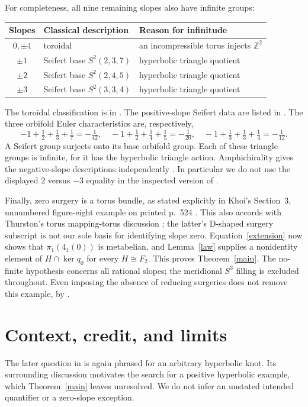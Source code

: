 \documentclass[11pt]{article}
\newcommand{\Z}{\mathbb Z}
\begin{document}
For completeness, all nine remaining slopes also have infinite groups:
\begin{center}
\begin{tabular}{c|l|l}
Slopes & Classical description & Reason for infinitude\\\hline
$0,\pm4$ & toroidal & an incompressible torus injects $\Z^2$\\
$\pm1$ & Seifert base $S^2(2,3,7)$ & hyperbolic triangle quotient\\
$\pm2$ & Seifert base $S^2(2,4,5)$ & hyperbolic triangle quotient\\
$\pm3$ & Seifert base $S^2(3,3,4)$ & hyperbolic triangle quotient
\end{tabular}
\end{center}
The toroidal classification is in \cite{BW}. The positive-slope Seifert
data are listed in \cite[Section~9.4, p.~71]{GM}. The three orbifold Euler
characteristics are, respectively,
\[
 -1+\tfrac12+\tfrac13+\tfrac17=-\tfrac1{42},\quad
 -1+\tfrac12+\tfrac14+\tfrac15=-\tfrac1{20},\quad
 -1+\tfrac13+\tfrac13+\tfrac14=-\tfrac1{12}.
\]
A Seifert group surjects onto its base orbifold group. Each of these
triangle groups is infinite, for it has the hyperbolic triangle action.
Amphichirality gives the negative-slope descriptions independently
\cite[Chapter~4]{Th}. In particular we do not use the displayed
$2$ versus $-3$ equality in the inspected version of \cite[Section~9.4]{GM}.

Finally, zero surgery is a torus bundle, as stated explicitly in Khoi's
Section~3, unnumbered figure-eight example on printed p.~524 \cite{Khoi}.
This also accords with Thurston's torus mapping-torus discussion
\cite[p.~70]{Th}; the latter's D-shaped surgery subscript is not our sole
basis for identifying slope zero. Equation~\eqref{extension} now shows
that $\pi_1(4_1(0))$ is metabelian, and Lemma~\ref{law} supplies a
nonidentity element of $H\cap\ker q_0$ for every $H\cong F_2$.
This proves Theorem~\ref{main}.
The no-finite hypothesis concerns all rational slopes; the meridional
$S^3$ filling is excluded throughout. Even imposing the absence of reducing
surgeries does not remove this example, by \cite[Lemma~2.1]{BW}.

\section{Context, credit, and limits}
The later question in \cite[Section~7.1]{IMT26} is again phrased for an
arbitrary hyperbolic knot. Its surrounding discussion motivates the search
for a positive hyperbolic example, which Theorem~\ref{main} leaves unresolved.
We do not infer an unstated intended quantifier or a zero-slope exception.
\end{document}
